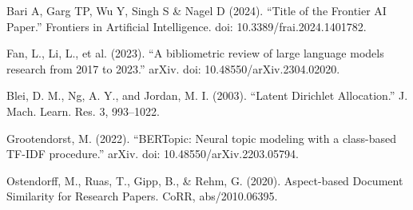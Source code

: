 \documentclass[12pt]{article}
\begin{document}
\begin{thebibliography}{9}
    
    Bari A, Garg TP, Wu Y, Singh S \& Nagel D (2024). “Title of the Frontier AI Paper.” Frontiers in Artificial Intelligence. doi: 10.3389/frai.2024.1401782.

    Fan, L., Li, L., et al. (2023). “A bibliometric review of large language models research from 2017 to 2023.” arXiv. doi: 10.48550/arXiv.2304.02020.
    
    Blei, D. M., Ng, A. Y., and Jordan, M. I. (2003). “Latent Dirichlet Allocation.” J. Mach. Learn. Res. 3, 993–1022.
    
    Grootendorst, M. (2022). “BERTopic: Neural topic modeling with a class-based TF-IDF procedure.” arXiv. doi: 10.48550/arXiv.2203.05794.

    Ostendorff, M., Ruas, T., Gipp, B., \& Rehm, G. (2020). Aspect-based Document Similarity for Research Papers. CoRR, abs/2010.06395.
    
\end{thebibliography}
\end{document}
